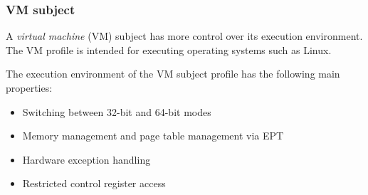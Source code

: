 \subsubsection{VM subject}
A \emph{virtual machine} (VM) subject has more control over its execution
environment. The VM profile is intended for executing operating systems such as
Linux.

The execution environment of the VM subject profile has the following main
properties:

\begin{itemize}
	\item Switching between 32-bit and 64-bit modes
	\item Memory management and page table management via EPT
	\item Hardware exception handling
	\item Restricted control register access
\end{itemize}
